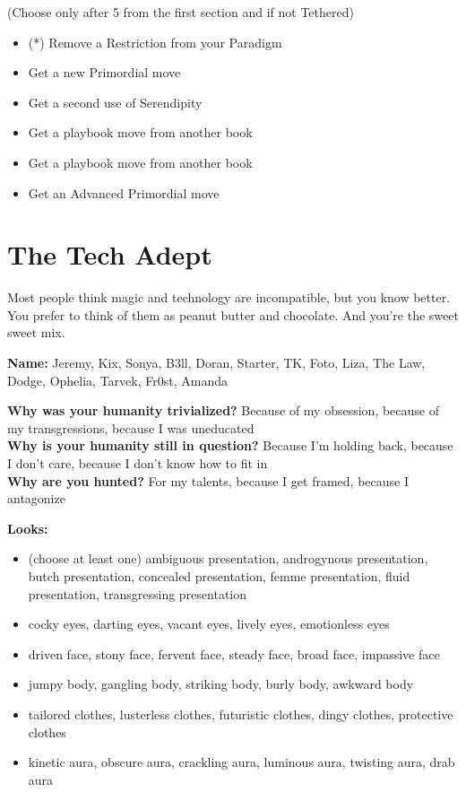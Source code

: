 \documentclass[
  oneside,
  statementpaper,
  9pt]{memoir}
\begin{document}
(Choose only after 5 from the first section and if not Tethered)

\begin{itemize}
\tightlist
\item
  (*) Remove a Restriction from your Paradigm
\item
  Get a new Primordial move
\item
  Get a second use of Serendipity
\item
  Get a playbook move from another book
\item
  Get a playbook move from another book
\item
  Get an Advanced Primordial move
\end{itemize}

\newpage

\hypertarget{the-tech-adept}{%
\section{The Tech Adept}\label{the-tech-adept}}

Most people think magic and technology are incompatible, but you know
better. You prefer to think of them as peanut butter and chocolate. And
you're the sweet sweet mix.

\textbf{Name:} Jeremy, Kix, Sonya, B3ll, Doran, Starter, TK, Foto, Liza,
The Law, Dodge, Ophelia, Tarvek, Fr0st, Amanda

\textbf{Why was your humanity trivialized?} Because of my obsession,
because of my transgressions, because I was uneducated\\
\textbf{Why is your humanity still in question?} Because I'm holding
back, because I don't care, because I don't know how to fit in\\
\textbf{Why are you hunted?} For my talents, because I get framed,
because I antagonize

\textbf{Looks:}

\begin{itemize}
\tightlist
\item
  (choose at least one) ambiguous presentation, androgynous
  presentation, butch presentation, concealed presentation, femme
  presentation, fluid presentation, transgressing presentation
\item
  cocky eyes, darting eyes, vacant eyes, lively eyes, emotionless eyes
\item
  driven face, stony face, fervent face, steady face, broad face,
  impassive face
\item
  jumpy body, gangling body, striking body, burly body, awkward body
\item
  tailored clothes, lusterless clothes, futuristic clothes, dingy
  clothes, protective clothes
\item
  kinetic aura, obscure aura, crackling aura, luminous aura, twisting
  aura, drab aura
\end{itemize}
\end{document}
